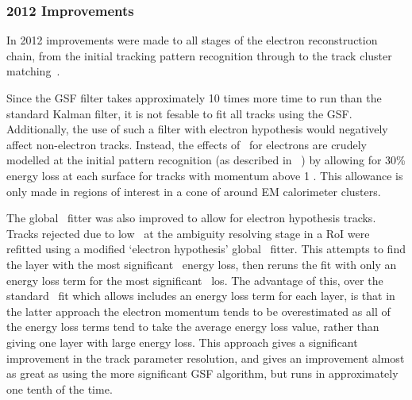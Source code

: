 \subsubsection{2012 Improvements}

In 2012 improvements were made to all stages of the electron reconstruction
chain, from the initial tracking pattern recognition through to the track
cluster matching~\cite{HSG2:1456228}. 

Since the GSF filter takes approximately 10 times more time to
run than the standard Kalman filter, it is not fesable to fit all tracks using
the GSF. Additionally, the use of such a filter with electron hypothesis would
negatively affect non-electron tracks. Instead, the effects of \brem\ for
electrons are crudely modelled at the initial pattern recognition (as described
in ~) by allowing for 30\% energy loss at each surface for tracks with
momentum above 1 \gev. This allowance is only made in regions of interest in a
cone of  around EM calorimeter clusters. 

The global \chisqaured\
fitter was also improved to allow for electron hypothesis tracks. Tracks
rejected due to low \chisquared\ at the ambiguity resolving stage in a RoI were
refitted using a modified `electron hypothesis' global \chisqaured\ fitter. This
attempts to find the layer with the most significant \brem\ energy loss, then
reruns the fit with only an energy loss term for the most significant \brem\
los. The advantage of this, over the standard \chisquared\ fit which allows
includes an energy loss term for each layer, is that in the latter approach the
electron momentum tends to be overestimated as all of the energy loss terms tend
to take the average energy loss value, rather than giving one layer with large
energy loss. This approach gives a significant improvement in the track
parameter resolution, and gives an improvement almost as great as using the more
significant GSF algorithm, but runs in approximately one tenth of the time.


